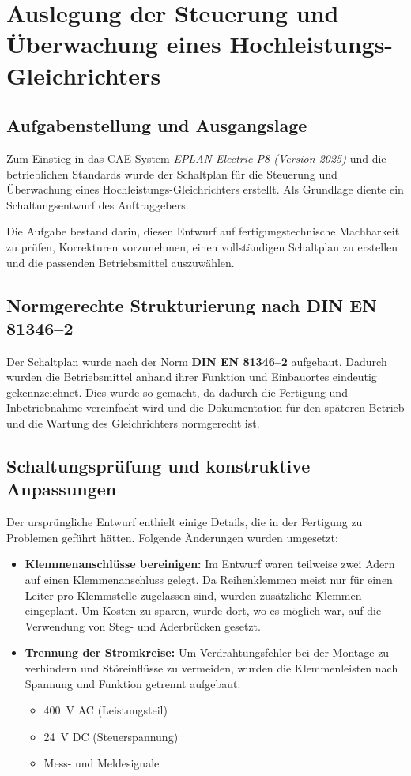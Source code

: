 \section{Auslegung der Steuerung und Überwachung eines Hochleistungs-Gleichrichters}

\subsection{Aufgabenstellung und Ausgangslage}
Zum Einstieg in das CAE-System \textit{EPLAN Electric P8 (Version 2025)} und die betrieblichen Standards wurde der Schaltplan für die Steuerung und Überwachung eines Hochleistungs-Gleichrichters erstellt.
Als Grundlage diente ein Schaltungsentwurf des Auftraggebers.

Die Aufgabe bestand darin, diesen Entwurf auf fertigungstechnische Machbarkeit zu prüfen, Korrekturen vorzunehmen, einen vollständigen Schaltplan zu erstellen und die passenden Betriebsmittel auszuwählen.

\subsection{Normgerechte Strukturierung nach DIN EN 81346--2}
Der Schaltplan wurde nach der Norm \textbf{DIN EN 81346--2} aufgebaut.
Dadurch wurden die Betriebsmittel anhand ihrer Funktion und Einbauortes eindeutig gekennzeichnet.
Dies wurde so gemacht, da dadurch die Fertigung und Inbetriebnahme vereinfacht wird und die Dokumentation für den späteren Betrieb und die Wartung des Gleichrichters normgerecht ist.

\subsection{Schaltungsprüfung und konstruktive Anpassungen}
Der ursprüngliche Entwurf enthielt einige Details, die in der Fertigung zu Problemen geführt hätten. Folgende Änderungen wurden umgesetzt:
\begin{itemize}
    \item \textbf{Klemmenanschlüsse bereinigen:} Im Entwurf waren teilweise zwei Adern auf einen Klemmenanschluss gelegt.
          Da Reihenklemmen meist nur für einen Leiter pro Klemmstelle zugelassen sind, wurden zusätzliche Klemmen eingeplant.
          Um Kosten zu sparen, wurde dort, wo es möglich war, auf die Verwendung von Steg- und Aderbrücken gesetzt.
    \item \textbf{Trennung der Stromkreise:} Um Verdrahtungsfehler bei der Montage zu verhindern und Störeinflüsse zu vermeiden, wurden die Klemmenleisten nach Spannung und Funktion getrennt aufgebaut:
          \begin{itemize}
              \item \SI{400}{\volt} AC (Leistungsteil)
              \item \SI{24}{\volt} DC (Steuerspannung)
              \item Mess- und Meldesignale
          \end{itemize}
\end{itemize}

